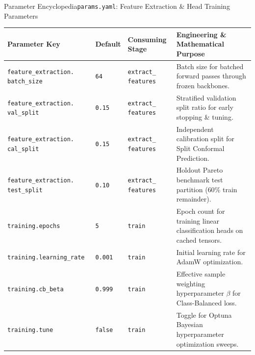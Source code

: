 \begin{frame}{Parameter Encyclopedia}{\texttt{params.yaml}: Feature Extraction \& Head Training Parameters}
    \vspace{-0.15cm}
    \begin{center}\scriptsize\renewcommand{\arraystretch}{0.85}
        \begin{tabular}{>{\raggedright\arraybackslash}p{3.5cm} >{\centering\arraybackslash}p{1.0cm} >{\raggedright\arraybackslash}p{2.1cm} >{\raggedright\arraybackslash}p{4.8cm}}
            \toprule
            \textbf{Parameter Key} & \textbf{Default} & \textbf{Consuming Stage} & \textbf{Engineering \& Mathematical Purpose} \\
            \midrule
            \texttt{feature\_extraction.} \newline \texttt{batch\_size} & \texttt{64} & \texttt{extract\_} \newline \texttt{features} & Batch size for batched forward passes through frozen backbones. \\
            \texttt{feature\_extraction.} \newline \texttt{val\_split} & \texttt{0.15} & \texttt{extract\_} \newline \texttt{features} & Stratified validation split ratio for early stopping \& tuning. \\
            \texttt{feature\_extraction.} \newline \texttt{cal\_split} & \texttt{0.15} & \texttt{extract\_} \newline \texttt{features} & Independent calibration split for Split Conformal Prediction. \\
            \texttt{feature\_extraction.} \newline \texttt{test\_split} & \texttt{0.10} & \texttt{extract\_} \newline \texttt{features} & Holdout Pareto benchmark test partition ($60\%$ train remainder). \\
            \texttt{training.epochs} & \texttt{5} & \texttt{train} & Epoch count for training linear classification heads on cached tensors. \\
            \texttt{training.learning\_rate} & \texttt{0.001} & \texttt{train} & Initial learning rate for AdamW optimization. \\
            \texttt{training.cb\_beta} & \texttt{0.999} & \texttt{train} & Effective sample weighting hyperparameter $\beta$ for Class-Balanced loss. \\
            \texttt{training.tune} & \texttt{false} & \texttt{train} & Toggle for Optuna Bayesian hyperparameter optimization sweeps. \\
            \bottomrule
        \end{tabular}
    \end{center}


\end{frame}
